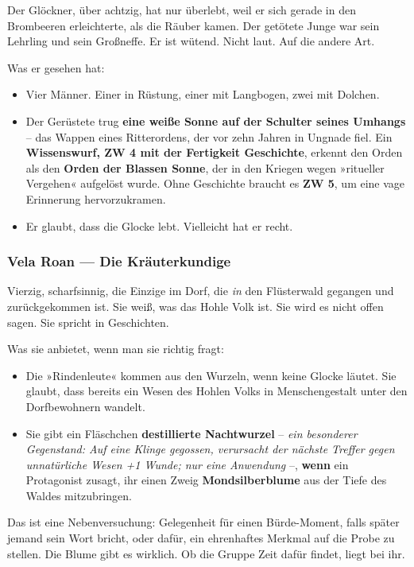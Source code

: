 \documentclass[10pt,a4paper]{article}
\newcommand{\tightlist}{\setlength{\itemsep}{0pt}\setlength{\parskip}{0pt}}
\begin{document}
Der Glöckner, über achtzig, hat nur überlebt, weil er sich gerade in den Brombeeren erleichterte, als die Räuber kamen. Der getötete Junge war sein Lehrling und sein Großneffe. Er ist wütend. Nicht laut. Auf die andere Art.

Was er gesehen hat:

\begin{itemize}
\tightlist
\item
  Vier Männer. Einer in Rüstung, einer mit Langbogen, zwei mit Dolchen.
\item
  Der Gerüstete trug \textbf{eine weiße Sonne auf der Schulter seines Umhangs} -- das Wappen eines Ritterordens, der vor zehn Jahren in Ungnade fiel. Ein \textbf{Wissenswurf, ZW 4 mit der Fertigkeit Geschichte}, erkennt den Orden als den \textbf{Orden der Blassen Sonne}, der in den Kriegen wegen »ritueller Vergehen« aufgelöst wurde. Ohne Geschichte braucht es \textbf{ZW 5}, um eine vage Erinnerung hervorzukramen.
\item
  Er glaubt, dass die Glocke lebt. Vielleicht hat er recht.
\end{itemize}

\subsubsection{Vela Roan --- Die Kräuterkundige}\label{vela-roan-die-kruxe4uterkundige}

Vierzig, scharfsinnig, die Einzige im Dorf, die \emph{in} den Flüsterwald gegangen und zurückgekommen ist. Sie weiß, was das Hohle Volk ist. Sie wird es nicht offen sagen. Sie spricht in Geschichten.

Was sie anbietet, wenn man sie richtig fragt:

\begin{itemize}
\tightlist
\item
  Die »Rindenleute« kommen aus den Wurzeln, wenn keine Glocke läutet. Sie glaubt, dass bereits ein Wesen des Hohlen Volks in Menschengestalt unter den Dorfbewohnern wandelt.
\item
  Sie gibt ein Fläschchen \textbf{destillierte Nachtwurzel} -- \emph{ein besonderer Gegenstand: Auf eine Klinge gegossen, verursacht der nächste Treffer gegen unnatürliche Wesen +1 Wunde; nur eine Anwendung} --, \textbf{wenn} ein Protagonist zusagt, ihr einen Zweig \textbf{Mondsilberblume} aus der Tiefe des Waldes mitzubringen.
\end{itemize}

Das ist eine Nebenversuchung: Gelegenheit für einen Bürde-Moment, falls später jemand sein Wort bricht, oder dafür, ein ehrenhaftes Merkmal auf die Probe zu stellen. Die Blume gibt es wirklich. Ob die Gruppe Zeit dafür findet, liegt bei ihr.
\end{document}
